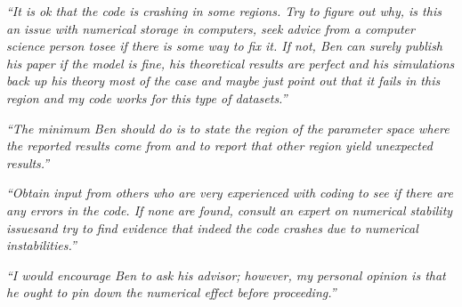 \documentclass[12pt]{beamer}
\newcommand\ans[1]{{\it ``#1''}}
\newcommand\gap{\vspace{5mm}}
\begin{document}
\begin{frame}

\ans{It is ok that the code is crashing in some regions.  Try to figure out why, is this an issue with numerical storage in computers, seek advice from a computer science person tosee if there is some way to fix it.  If not, Ben can surely publish his paper if the model is fine, his theoretical results are perfect and his simulations back up his theory most of the case and maybe just point out that it fails in this region and my code works for this type of datasets.}

\gap

\ans{The minimum Ben should do is to state the region of the parameter space where the reported results come from and to report that other region yield unexpected results.}

\end{frame}
\begin{frame}
  
\ans{Obtain input from others who are very experienced with coding to see if there are any errors in the code.  If none are found, consult an expert on numerical stability issuesand try to find evidence that indeed the code crashes due to numerical instabilities.}

\gap

\ans{I  would  encourage  Ben  to  ask  his  advisor;  however,  my  personal  opinion  is  that  he ought to pin down the numerical effect before proceeding.}








\end{frame}
\end{document}
